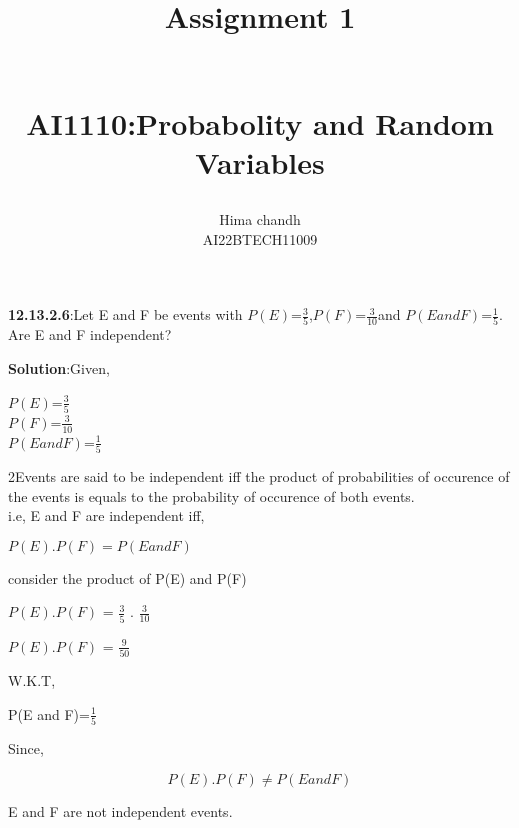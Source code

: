 \documentclass[10pt]{article}
\begin{document}
\title{\begin{Huge}Assignment 1\end{Huge}\\AI1110:Probabolity and Random Variables}
\author{Hima chandh\\AI22BTECH11009}
\maketitle
\textbf{12.13.2.6}:Let E and F be events with $P(E)$=$\frac{3}{5}$,$P(F)$=$\frac{3}{10}$and $P(E and F)$=$\frac{1}{5}$.
Are E and F independent?

\textbf{Solution}:Given,

\begin{center}
$P(E)$=$\frac{3}{5}$
\\$P(F)$=$\frac{3}{10}$
\\$P(E and F)$=$\frac{1}{5}$
\end{center}

2Events are said to be independent iff the product of probabilities of occurence of the events is equals to the probability of occurence of both events.
\\i.e, E and F are independent iff,

\begin{center}
$P(E).P(F) = P(E and F)$
\end{center}

consider the product of P(E) and P(F)

\begin{center}
$P(E).P(F)$ = $\frac{3}{5}$ . $\frac{3}{10}$ 

$P(E).P(F)$ = $\frac{9}{50}$
\end{center}
W.K.T,
\begin{center}
P(E and F)=$\frac{1}{5}$
\end{center}
Since,
\begin{center}
$$P(E).P(F) \neq P(E and F)$$
\end{center}
E and F are not independent events.
\end{document}
